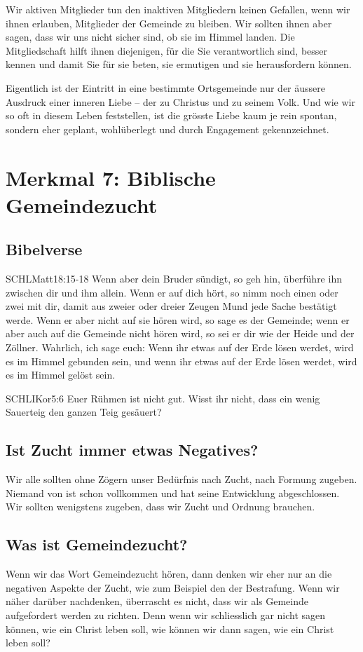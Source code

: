 \documentclass{../../inc/mybib}
\begin{document}
Wir aktiven Mitglieder tun den inaktiven Mitgliedern keinen Gefallen, wenn wir ihnen erlauben, Mitglieder der Gemeinde zu bleiben. Wir sollten ihnen aber sagen, dass wir uns nicht sicher sind, ob sie im Himmel landen. Die Mitgliedschaft hilft ihnen diejenigen, für die Sie verantwortlich sind, besser kennen und damit Sie für sie beten, sie ermutigen und sie herausfordern können.

Eigentlich ist der Eintritt in eine bestimmte Ortsgemeinde nur der äussere Ausdruck einer inneren Liebe -- der zu Christus und zu seinem Volk. Und wie wir so oft in diesem Leben feststellen, ist die grösste Liebe kaum je rein spontan, sondern eher geplant, wohlüberlegt und durch Engagement gekennzeichnet.
\section{Merkmal 7: Biblische Gemeindezucht}
\subsection{Bibelverse}
\begin{bibelbox}{SCHL}{Matt}{18:15-18}
    Wenn aber dein Bruder sündigt, so geh hin, überführe ihn zwischen dir und ihm allein. Wenn er auf dich hört, so nimm noch einen oder zwei mit dir, damit aus zweier oder dreier Zeugen Mund jede Sache bestätigt werde. Wenn er aber nicht auf sie hören wird, so sage es der Gemeinde; wenn er aber auch auf die Gemeinde nicht hören wird, so sei er dir wie der Heide und der Zöllner. Wahrlich, ich sage euch: Wenn ihr etwas auf der Erde lösen werdet, wird es im Himmel gebunden sein, und wenn ihr etwas auf der Erde lösen werdet, wird es im Himmel gelöst sein.
\end{bibelbox}
\begin{bibelbox}{SCHL}{IKor}{5:6}
    Euer Rühmen ist nicht gut. Wisst ihr nicht, dass ein wenig Sauerteig den ganzen Teig gesäuert?
\end{bibelbox}
\subsection{Ist Zucht immer etwas Negatives? }
Wir alle sollten ohne Zögern unser Bedürfnis nach Zucht, nach Formung zugeben. Niemand von ist schon vollkommen und hat seine Entwicklung abgeschlossen. Wir sollten wenigstens zugeben, dass wir Zucht und Ordnung brauchen.
\subsection{Was ist Gemeindezucht? }
Wenn wir das Wort Gemeindezucht hören, dann denken wir eher nur an die negativen Aspekte der Zucht, wie zum Beispiel den der Bestrafung. Wenn wir näher darüber nachdenken, überrascht es nicht, dass wir als Gemeinde aufgefordert werden zu richten. Denn wenn wir schliesslich gar nicht sagen können, wie ein Christ leben soll, wie können wir dann sagen, wie ein Christ leben soll?
\end{document}

